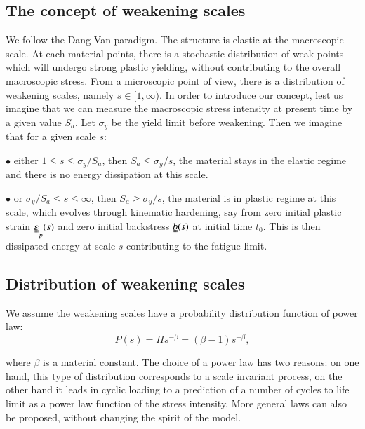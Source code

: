 \documentclass[3p,times,number,review]{elsarticle}
\begin{document}
\subsection{The concept of weakening scales} 

We follow the Dang Van paradigm. The structure is elastic at the macroscopic scale. At each material points, there is a stochastic distribution of weak points which will undergo strong plastic yielding, without contributing to the overall macroscopic stress. From a microscopic point of view, there is a distribution of weakening scales, namely $s\in[1,\infty)$. In order to introduce our concept, lest us imagine that we can measure the macroscopic stress intensity at present time by a given value $S_{a}$. Let $\sigma_y$ be the yield limit before weakening. Then we imagine that for a given scale $s$:

\vspace{6pt}
\noindent
$\bullet$ either $1\leqslant s\leqslant \sigma_y/S_{a}$, then $S_{a}\leqslant \sigma_y/s$, the material stays in the elastic regime and there is no energy dissipation at this scale.

\vspace{6pt}
\noindent
$\bullet$ or $\sigma_y/S_{a}\leqslant s\leqslant \infty$, then $S_{a}\geqslant \sigma_y/s$, the material is in plastic regime at this scale, which evolves through kinematic hardening, say from zero initial plastic strain $\uuline{\varepsilon}_p(s)$ and zero initial backstress $\uuline{b}(s)$ at initial time $t_0$. This is then dissipated energy at scale $s$ contributing to the fatigue limit.


\vspace{6pt}

\subsection{Distribution of weakening scales}

We assume the weakening scales have a  probability distribution function of power law:
\begin{equation}
P(s) = Hs^{-\beta}=(\beta-1)s^{-\beta},
\label{eq.ps}
\end{equation}

where $\beta$ is a material constant. 
The choice of a power law has two reasons: on one hand, this type of distribution corresponds to a scale invariant process, on the other hand it leads in cyclic loading to a prediction of a number of cycles to life limit as a power law function of the stress intensity. More general laws can also be proposed, without changing the spirit of the model.
\end{document}
